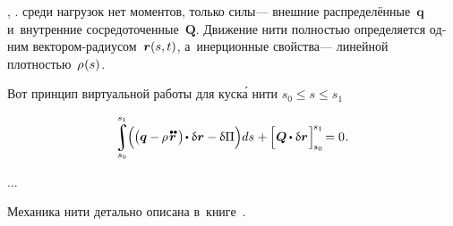 \begin{otherlanguage}{russian}

 ,      .
 среди нагрузок нет моментов, только  силы\:--- внешние распределённые~$\bm{q}$ и~внутренние сосредоточенные~$\bm{Q}$.
Движение нити полностью определяется одним вектором-радиусом~${\bm{r}(s,t)}$, а~инерционные свойства\:--- линейной плотностью~${\rho\hspace{.1ex}(s)}$.

Вот принцип виртуальной работы для куск\'{а} нити ${s_0 \leq s \leq s_1}$

\nopagebreak\vspace{-0.2em}\begin{equation}
\scalebox{.95}{$
\displaystyle \integral\displaylimits_{\raisemath{.05em}{\mathclap{s_0}}}^{\raisemath{.15em}{\mathclap{s_1}}}
$}
\hspace{-0.25ex} \Bigl( \hspace{-0.1ex}
\bigl( \bm{q} - \hspace{-0.12ex} \rho \hspace{.2ex} \mathdotdotabove{\locationvector} \hspace{.36ex} \bigr)
\hspace{-0.25ex} \dotp \variation{\locationvector}
- \variation{\potentialenergydensity}
\Bigr) ds
\hspace{.1ex} + \hspace{-0.1ex} \Bigl[ \hspace{.1ex}
\bm{Q} \hspace{-0.1ex} \dotp \variation{\locationvector}
\hspace{.15ex} \Bigr]_{\hspace{-0.25ex}s_0}^{\hspace{-0.25ex}s_1}
\hspace{-0.33ex} = 0
\hspace{.1ex} .
\end{equation}

...

Механика нити детально описана в~книге~\cite{merkin-threadmechanics}.

\end{otherlanguage}

